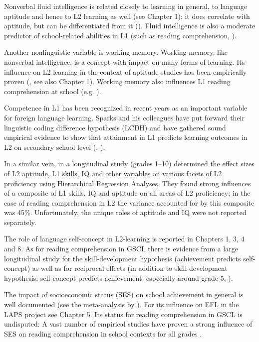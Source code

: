 \documentclass[output=paper]{langsci/langscibook}
\begin{document}
Nonverbal fluid intelligence is related closely to learning in general, to language aptitude and hence to L2 learning as well (see Chapter 1); it does correlate with aptitude, but can be differentiated from it (\citealt{SparksEtAl2012}). Fluid intelligence is also a moderate predictor of school-related abilities in L1 (such as reading comprehension, \citealt{PengEtAl2019}).

Another nonlinguistic variable is working memory. Working memory, like nonverbal intelligence, is a concept with impact on many forms of learning. Its influence on L2 learning in the context of aptitude studies has been empirically proven (\citealt{WenEtAl2017}, see also Chapter 1). Working memory also influences L1 reading comprehension at school (e.g. \citealt{PengEtAl2017}).

Competence in L1 has been recognized in recent years as an important variable for foreign language learning. Sparks and his colleagues have put forward their linguistic coding difference hypothesis (LCDH) and have gathered sound empirical evidence to show that attainment in L1 predicts learning outcomes in L2 on secondary school level (\citealt{SparksEtAl2012}, \citealt{Li2016}).

In a similar vein, in a longitudinal study (grades 1--10) \citet{SparksEtAl2012} determined the effect sizes of L2 aptitude, L1 skills, IQ and other variables on various facets of L2 proficiency using Hierarchical Regression Analyses. They found strong influences of a composite of L1 skills, IQ and aptitude on all areas of L2 proficiency; in the case of reading comprehension in L2 the variance accounted for by this composite was 45\%. Unfortunately, the unique roles of aptitude and IQ were not reported separately. 

The role of language self-concept in L2-learning is reported in Chapters 1, 3, 4 and 8. As for reading comprehension in GSCL there is evidence from a large longitudinal study for the skill-development hypothesis (achievement predicts self-concept) as well as for reciprocal effects (in addition to skill-development hypothesis: self-concept predicts achievement, especially around grade 5, \citealt{RetelsdorfEtAl2014}).

The impact of socioeconomic status (SES) on school achievement in general is well documented (see the meta-analysis by \citealt{Sirin2005}). For its influence on EFL in the LAPS project see Chapter 5. Its status for reading comprehension in GSCL is undisputed: A vast number of empirical studies have proven a strong influence of SES on reading comprehension in school contexts for all grades \citep{Schaffner2009}.
\end{document}
